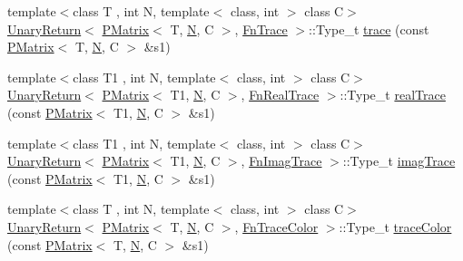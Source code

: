 \begin{DoxyCompactItemize}
\item 
{\footnotesize template$<$class T , int N, template$<$ class, int $>$ class C$>$ }\\\mbox{\hyperlink{structENSEM_1_1UnaryReturn}{Unary\+Return}}$<$ \mbox{\hyperlink{classENSEM_1_1PMatrix}{P\+Matrix}}$<$ T, \mbox{\hyperlink{operator__name__util_8cc_a7722c8ecbb62d99aee7ce68b1752f337}{N}}, C $>$, \mbox{\hyperlink{structENSEM_1_1FnTrace}{Fn\+Trace}} $>$\+::Type\+\_\+t \mbox{\hyperlink{group__primmatrix_gafc761796f6ca23ee43cd937f3459e3ce}{trace}} (const \mbox{\hyperlink{classENSEM_1_1PMatrix}{P\+Matrix}}$<$ T, \mbox{\hyperlink{operator__name__util_8cc_a7722c8ecbb62d99aee7ce68b1752f337}{N}}, C $>$ \&s1)
\item 
{\footnotesize template$<$class T1 , int N, template$<$ class, int $>$ class C$>$ }\\\mbox{\hyperlink{structENSEM_1_1UnaryReturn}{Unary\+Return}}$<$ \mbox{\hyperlink{classENSEM_1_1PMatrix}{P\+Matrix}}$<$ T1, \mbox{\hyperlink{operator__name__util_8cc_a7722c8ecbb62d99aee7ce68b1752f337}{N}}, C $>$, \mbox{\hyperlink{structENSEM_1_1FnRealTrace}{Fn\+Real\+Trace}} $>$\+::Type\+\_\+t \mbox{\hyperlink{group__primmatrix_gaf2db8b017f816bb958ba639899fa1cf7}{real\+Trace}} (const \mbox{\hyperlink{classENSEM_1_1PMatrix}{P\+Matrix}}$<$ T1, \mbox{\hyperlink{operator__name__util_8cc_a7722c8ecbb62d99aee7ce68b1752f337}{N}}, C $>$ \&s1)
\item 
{\footnotesize template$<$class T1 , int N, template$<$ class, int $>$ class C$>$ }\\\mbox{\hyperlink{structENSEM_1_1UnaryReturn}{Unary\+Return}}$<$ \mbox{\hyperlink{classENSEM_1_1PMatrix}{P\+Matrix}}$<$ T1, \mbox{\hyperlink{operator__name__util_8cc_a7722c8ecbb62d99aee7ce68b1752f337}{N}}, C $>$, \mbox{\hyperlink{structENSEM_1_1FnImagTrace}{Fn\+Imag\+Trace}} $>$\+::Type\+\_\+t \mbox{\hyperlink{group__primmatrix_gaa17cf25ee54da2665418c0cfbccc0ae9}{imag\+Trace}} (const \mbox{\hyperlink{classENSEM_1_1PMatrix}{P\+Matrix}}$<$ T1, \mbox{\hyperlink{operator__name__util_8cc_a7722c8ecbb62d99aee7ce68b1752f337}{N}}, C $>$ \&s1)
\item 
{\footnotesize template$<$class T , int N, template$<$ class, int $>$ class C$>$ }\\\mbox{\hyperlink{structENSEM_1_1UnaryReturn}{Unary\+Return}}$<$ \mbox{\hyperlink{classENSEM_1_1PMatrix}{P\+Matrix}}$<$ T, \mbox{\hyperlink{operator__name__util_8cc_a7722c8ecbb62d99aee7ce68b1752f337}{N}}, C $>$, \mbox{\hyperlink{structENSEM_1_1FnTraceColor}{Fn\+Trace\+Color}} $>$\+::Type\+\_\+t \mbox{\hyperlink{group__primmatrix_ga1d05c45afa351dba712d9d083a013d41}{trace\+Color}} (const \mbox{\hyperlink{classENSEM_1_1PMatrix}{P\+Matrix}}$<$ T, \mbox{\hyperlink{operator__name__util_8cc_a7722c8ecbb62d99aee7ce68b1752f337}{N}}, C $>$ \&s1)

\end{DoxyCompactItemize}
